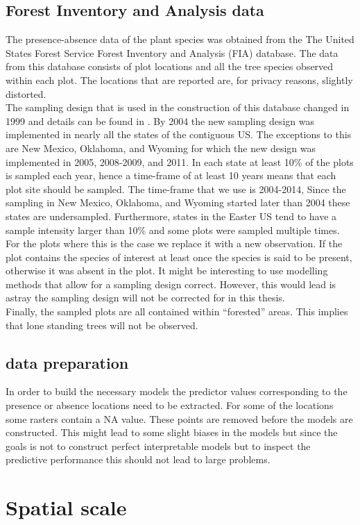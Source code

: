 \subsection{Forest Inventory and Analysis data}
The presence-absence data of the plant species was obtained from the The United States Forest Service Forest Inventory and Analysis (FIA) database. The data from this database consists of plot locations and all the tree species observed within each plot. The locations that are reported are, for privacy reasons, slightly distorted.\\ 

The sampling design that is used in the construction of this database changed in 1999 and details can be found in \cite{fiamanual}. By 2004 the new sampling design was implemented in nearly all the states of the contiguous US. The exceptions to this are New Mexico, Oklahoma, and Wyoming for which the new design was implemented in 2005, 2008-2009, and 2011. In each state at least 10\% of the plots is sampled each year, hence a time-frame of at least 10 years means that each plot site should be sampled. The time-frame that we use is 2004-2014, Since the sampling in New Mexico, Oklahoma, and Wyoming started later than 2004 these states are undersampled. Furthermore, states in the Easter US tend to have a sample intensity larger than 10\% and some plots were sampled multiple times. For the plots where this is the case we replace it with a new observation. If the plot contains the species of interest at least once the species is said to be present, otherwise it was absent in the plot. It might be interesting to use modelling methods that allow for a sampling design correct. However, this would lead is astray the sampling design will not be corrected for in this thesis.\\

Finally, the sampled plots are all contained within ``forested'' areas. This implies that lone standing trees will not be observed.

\subsection{data preparation}
In order to build the necessary models the predictor values corresponding to the presence or absence locations need to be extracted. For some of the locations some rasters contain a \textsc{NA} value. These points are removed before the models are constructed. This might lead to some slight biases in the models but since the goals is not to construct perfect interpretable models but to inspect the predictive performance this should not lead to large problems.
\section{Spatial scale}
\label{sec:SpatialScale}

